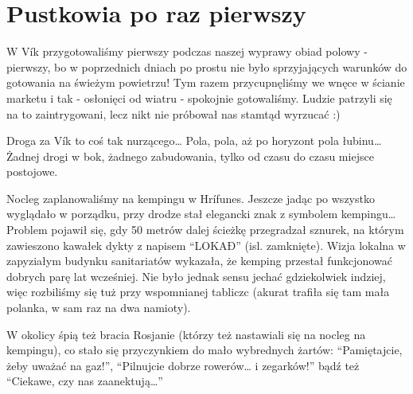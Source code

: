 \section{Pustkowia po raz pierwszy}

W Vík przygotowaliśmy pierwszy podczas naszej wyprawy obiad polowy - pierwszy, bo w poprzednich dniach po prostu nie było sprzyjających warunków do gotowania na świeżym powietrzu! Tym razem przycupnęliśmy we wnęce w ścianie marketu i tak - osłonięci od wiatru - spokojnie gotowaliśmy. Ludzie patrzyli się na to zaintrygowani, lecz nikt nie próbował nas stamtąd wyrzucać :)

Droga za Vík to coś tak nurzącego… Pola, pola, aż po horyzont pola łubinu…Żadnej drogi w bok, żadnego zabudowania, tylko od czasu do czasu miejsce postojowe.


Nocleg zaplanowaliśmy na kempingu w Hrífunes. Jeszcze jadąc po  wszystko wyglądało w porządku, przy drodze stał elegancki znak z symbolem kempingu… Problem pojawił się, gdy 50 metrów dalej ścieżkę przegradzał sznurek, na którym zawieszono kawałek dykty z napisem “LOKAÐ” (isl. zamknięte). Wizja lokalna w zapyziałym budynku sanitariatów wykazała, że kemping przestał funkcjonować dobrych parę lat wcześniej. Nie było jednak sensu jechać gdziekolwiek indziej, więc rozbiliśmy się tuż przy wspomnianej tabliczc (akurat trafiła się tam mała polanka, w sam raz na dwa namioty).

W okolicy śpią też bracia Rosjanie (którzy też nastawiali się na nocleg na kempingu), co stało się przyczynkiem do mało wybrednych żartów: “Pamiętajcie, żeby uważać na gaz!”, “Pilnujcie dobrze rowerów… i zegarków!” bądź też “Ciekawe, czy nas zaanektują…”